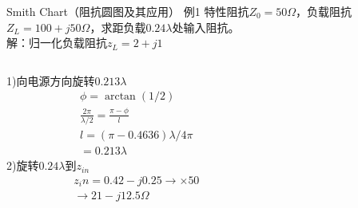 \begin{frame}{Smith Chart（阻抗圆图及其应用）}
 例1 \quad 特性阻抗$Z_0=50\Omega$，负载阻抗$Z_L=100+j50\Omega$，求距负载$0.24\lambda$处输入阻抗。\\
 解：归一化负载阻抗$z_L=2+j1$\\
 \begin{columns}
  \begin{column}{0.5\linewidth}
   1)\quad 向电源方向旋转$0.213\lambda$
   \begin{align*}
    \phi=\arctan(1/2)                         \\
    \frac{2\pi}{\lambda/2}=\frac{\pi-\phi}{l} \\
    l =(\pi-0.4636)\lambda/4\pi               \\
    =0.213\lambda
   \end{align*}
   2)\quad 旋转$0.24\lambda$到$z_{in}$
   \begin{align*}
    z_in=0.42-j0.25\rightarrow\times 50 \\
    \rightarrow 21-j12.5\Omega
   \end{align*}
  \end{column}
  \begin{column}{0.5\linewidth}

\end{column}
\end{columns}
\end{frame}
